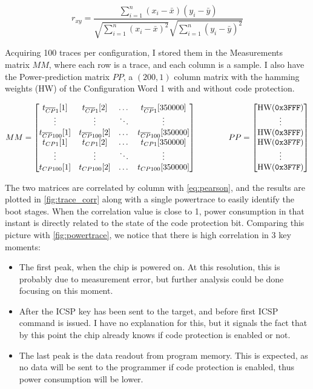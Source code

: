 \documentclass[a4paper,english,twoside,10pt]{article}
\begin{document}
\begin{equation}\label{eq:pearson}
	r_{xy} =\frac{\sum ^n _{i=1}(x_i - \bar{x})(y_i - \bar{y})}{\sqrt{\sum ^n _{i=1}(x_i - \bar{x})^2} \sqrt{\sum ^n _{i=1}(y_i - \bar{y})^2}}
\end{equation}

Acquiring 100 traces per configuration, I stored them in the Measurements matrix \(MM\), where each row is a trace, and each column is a sample. I also have the Power-prediction matrix \(PP\), a \((200, 1)\) column matrix with the hamming weights (HW) of the Configuration Word 1 with and without code protection.

\[
MM = 
\begin{bmatrix}
	t_{\overline{\footnotesize CP}1}[1] & t_{\overline{\footnotesize CP}1}[2] & \dots & t_{\overline{\footnotesize CP}1}[350000] \\
	\vdots & \vdots & \ddots & \vdots \\
	t_{\overline{\footnotesize CP}100}[1] & t_{\overline{\footnotesize CP}100}[2] & \dots & t_{\overline{\footnotesize CP}100}[350000] \\
	t_{\footnotesize CP1}[1] & t_{\footnotesize CP1}[2] & \dots & t_{\footnotesize CP1}[350000] \\
	\vdots & \vdots & \ddots & \vdots \\
	t_{\footnotesize CP100}[1] & t_{\footnotesize CP100}[2] & \dots & t_{\footnotesize CP100}[350000]
\end{bmatrix}
\qquad \qquad
PP =
\begin{bmatrix}
	\text{HW}(\mbox{\texttt{0x3FFF}}) \\
	\vdots \\
	\text{HW}(\mbox{\texttt{0x3FFF}}) \\
	\text{HW}(\mbox{\texttt{0x3F7F}}) \\
	\vdots \\
	\text{HW}(\mbox{\texttt{0x3F7F}})
\end{bmatrix}
\]

The two matrices are correlated by column with \autoref{eq:pearson}, and the results are plotted in \autoref{fig:trace_corr} along with a single powertrace to easily identify the boot stages. When the correlation value is close to 1, power consumption in that instant is directly related to the state of the code protection bit. Comparing this picture with \autoref{fig:powertrace}, we notice that there is high correlation in 3 key moments:
\begin{itemize}
	\item The first peak, when the chip is powered on. At this resolution, this is probably due to measurement error, but further analysis could be done focusing on this moment.
	\item After the ICSP key has been sent to the target, and before first ICSP command is issued. I have no explanation for this, but it signals the fact that by this point the chip already knows if code protection is enabled or not.
	\item The last peak is the data readout from program memory. This is expected, as no data will be sent to the programmer if code protection is enabled, thus power consumption will be lower.
\end{itemize}
\end{document}
